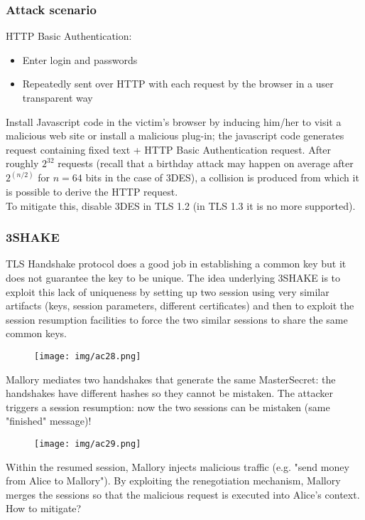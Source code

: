 \documentclass[a4paper, 10pt, titlepage]{article}
\begin{document}
\subsubsection*{Attack scenario}
HTTP Basic Authentication:
\begin{itemize}
\item Enter login and passwords
\item Repeatedly sent over HTTP with each request by the browser in a user transparent way
\end{itemize}
Install Javascript code in the victim’s browser by inducing him/her to visit a malicious web site or install a malicious plug-in; the javascript code generates request containing fixed text + HTTP Basic Authentication request. After roughly $2^{32}$ requests (recall that a birthday attack may happen on average after $2^{(n/2)}$ for $n=64$ bits in the case of 3DES), a collision is produced from which it is possible to derive the HTTP request. \\
To mitigate this, disable 3DES in TLS 1.2 (in TLS 1.3 it is no more supported).

\subsubsection{3SHAKE}
TLS Handshake protocol does a good job in establishing a common key but it does not guarantee the key to be unique. The idea underlying 3SHAKE is to exploit this lack of uniqueness by setting up two session using very similar artifacts (keys, session parameters, different certificates) and then to exploit the session resumption facilities to force the two similar sessions to share the same common keys.
\begin{figure}[h]
\centering
\texttt{[image: img/ac28.png]}
\end{figure}
Mallory mediates two handshakes that generate the same MasterSecret: the handshakes have different hashes so they cannot be mistaken.
The attacker triggers a session resumption: now the two sessions can be mistaken (same "finished" message)!
\begin{figure}[h]
\centering
\texttt{[image: img/ac29.png]}
\end{figure}
Within the resumed session, Mallory injects malicious traffic (e.g. "send money from Alice to Mallory"). By exploiting the renegotiation mechanism, Mallory merges the sessions so that the malicious request is executed into Alice’s context. How to mitigate? %
\end{document}
